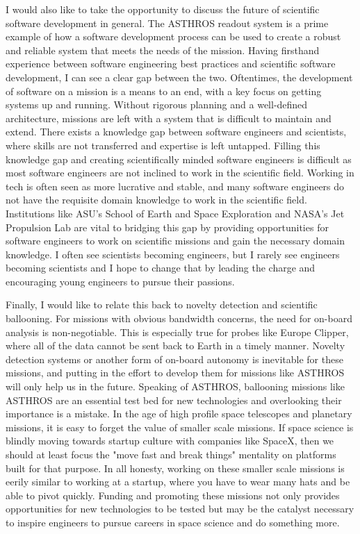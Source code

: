 I would also like to take the opportunity to discuss the future of scientific software development in general.
The ASTHROS readout system is a prime example of how a software development process can be used to create a robust and reliable system that meets the needs of the mission.
Having firsthand experience between software engineering best practices and scientific software development, I can see a clear gap between the two.
Oftentimes, the development of software on a mission is a means to an end, with a key focus on getting systems up and running.
Without rigorous planning and a well-defined architecture, missions are left with a system that is difficult to maintain and extend.
There exists a knowledge gap between software engineers and scientists, where skills are not transferred and expertise is left untapped. 
Filling this knowledge gap and creating scientifically minded software engineers is difficult as most software engineers are not inclined to work in the scientific field.
Working in tech is often seen as more lucrative and stable, and many software engineers do not have the requisite domain knowledge to work in the scientific field.
Institutions like ASU's School of Earth and Space Exploration and NASA's Jet Propulsion Lab are vital to bridging this gap by providing opportunities for software engineers to work on scientific missions and gain the necessary domain knowledge.
I often see scientists becoming engineers, but I rarely see engineers becoming scientists and I hope to change that by leading the charge and encouraging young engineers to pursue their passions. 

Finally, I would like to relate this back to novelty detection and scientific ballooning.
For missions with obvious bandwidth concerns, the need for on-board analysis is non-negotiable.
This is especially true for probes like Europe Clipper, where all of the data cannot be sent back to Earth in a timely manner.
Novelty detection systems or another form of on-board autonomy is inevitable for these missions, and putting in the effort to develop them for missions like ASTHROS will only help us in the future.
Speaking of ASTHROS, ballooning missions like ASTHROS are an essential test bed for new technologies and overlooking their importance is a mistake.
In the age of high profile space telescopes and planetary missions, it is easy to forget the value of smaller scale missions.
If space science is blindly moving towards startup culture with companies like SpaceX, then we should at least focus the "move fast and break things" mentality on platforms built for that purpose.
In all honesty, working on these smaller scale missions is eerily similar to working at a startup, where you have to wear many hats and be able to pivot quickly.
Funding and promoting these missions not only provides opportunities for new technologies to be tested but may be the catalyst necessary to inspire engineers to pursue careers in space science and do something more.